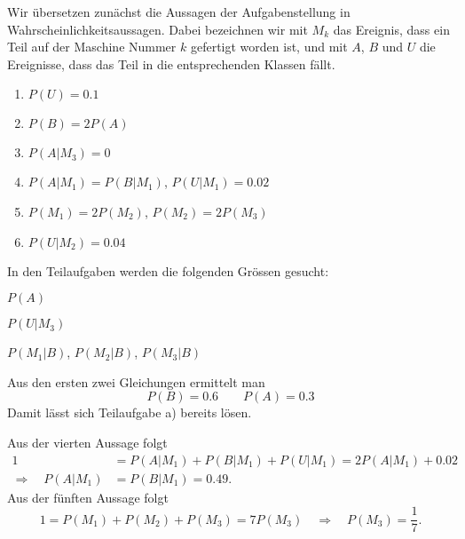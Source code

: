 \begin{loesung}
Wir übersetzen zunächst die Aussagen der Aufgabenstellung
in Wahrscheinlichkeitsaussagen. Dabei bezeichnen wir mit $M_k$ das
Ereignis, dass ein Teil auf der Maschine Nummer $k$ gefertigt
worden ist, und mit $A$, $B$ und $U$ die Ereignisse, dass das Teil
in die entsprechenden Klassen fällt.
\begin{enumerate}
\item $P(U)=0.1$                                %
\item $P(B)=2P(A)$                              %
\item $P(A|M_3)=0$
\item $P(A|M_1)=P(B|M_1)$, $P(U|M_1)=0.02$
\item $P(M_1)=2P(M_2)$, $P(M_2)=2P(M_3)$
\item $P(U|M_2)=0.04$                           %
\end{enumerate}
In den Teilaufgaben werden die folgenden Grössen gesucht:
\begin{teilaufgaben}
\item $P(A)$
\item $P(U|M_3)$
\item $P(M_1|B)$, $P(M_2|B)$, $P(M_3|B)$
\end{teilaufgaben}

Aus den ersten zwei Gleichungen ermittelt man
\[
P(B)=0.6\qquad P(A)=0.3
\]
Damit lässt sich Teilaufgabe a) bereits lösen.

Aus der vierten Aussage folgt
\begin{align*}
1&=P(A|M_1)+P(B|M_1)+P(U|M_1)=2P(A|M_1)+0.02
\\
\Rightarrow\quad
P(A|M_1)&=P(B|M_1)=0.49.
\end{align*}
Aus der fünften Aussage folgt
\[
1=P(M_1)+P(M_2)+P(M_3)=7P(M_3)
\quad\Rightarrow\quad
P(M_3)=\frac17.
\]


\end{loesung}
